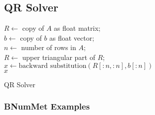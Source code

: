 \subsection*{QR Solver}
\begin{algorithm}[H]
\SetAlgoLined
\DontPrintSemicolon
{}
$R \gets$ copy of $A$ as float matrix;\\
$b \gets$ copy of $b$ as float vector;\\
$n \gets$ number of rows in $A$;\\
$R \gets$ upper triangular part of $R$;\\
$x \gets \text{backward substitution}(R[:n,:n], b[:n])$\\
\Return $x$
\caption{QR Solver}
\end{algorithm}
\subsubsection*{BNumMet Examples}
